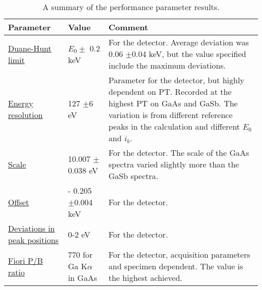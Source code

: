 \begin{table}[phtb]
    \begin{center}
        \caption{
            A summary of the performance parameter results.
        }
        \renewcommand*{\arraystretch}{1.4}
        \label{tab:results:performance_summary}
        \begin{tabular}{p{2.5cm}p{4cm}p{7cm}}
            \hline
            \textbf{Parameter}                                            & \textbf{Value}                & \textbf{Comment}                                                                                                                                                                                       \\
            \hline%
            \hyperref[results:duane_hunt]{Duane-Hunt limit}               & $E_0 \pm$ 0.2 keV             & For the detector. Average deviation was 0.06 $\pm$0.04 keV, but the value specified include the maximum deviations.                                                                                    \\
            \hyperref[results:energy_resolution]{Energy resolution}       & 127 $\pm$6 eV                 & Parameter for the detector, but highly dependent on PT. Recorded at the highest PT on GaAs and GaSb. The variation is from different reference peaks in the calculation and different $E_0$ and $i_b$. \\
            \hyperref[results:scaleoffset]{Scale}                         & 10.007 $\pm$0.038 eV          & For the detector. The scale of the GaAs spectra varied slightly more than the GaSb spectra.                                                                                                            \\
            \hyperref[results:scaleoffset]{Offset}                        & - 0.205 $\pm$0.004 keV        & For the detector.                                                                                                                                                                                      \\
            \hyperref[results:scaleoffset]{Deviations in peak positions}  & 0-2 eV                        & For the detector.                                                                                                                                                                                      \\
            \hyperref[results:fiori]{Fiori P/B ratio}                     & 770 for Ga K$\alpha$ in GaAs  & For the detector, acquisition parameters and specimen dependent. The value is the highest achieved.                                                                                                    \\

\end{tabular}
\end{center}
\end{table}
